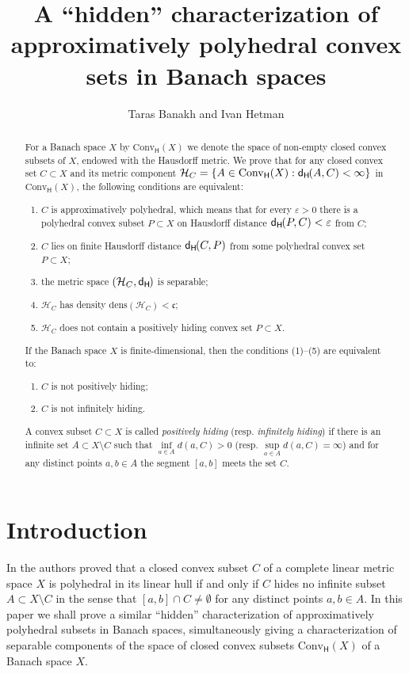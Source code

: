 \documentclass{amsart}
\title[On approximatively polyhedral convex sets]{A ``hidden'' characterization of\\ approximatively polyhedral convex sets in Banach spaces}
\author{Taras Banakh and Ivan Hetman}
\newcommand{\e}{\varepsilon}
\newcommand{\Conv}{\mathrm{Conv}}
\newcommand{\HH}{\mathcal H}
\newcommand{\dens}{\mathrm{dens}}
\newcommand{\dH}{\mathsf{d}_{\mathsf H}\kern-1pt}
\newcommand{\ConvH}{\Conv_{\mathsf H}}
\theoremstyle{definition}
\begin{document}
\begin{abstract} For a Banach space $X$ by $\ConvH(X)$ we denote the space of non-empty closed convex subsets of $X$, endowed with the Hausdorff metric. We prove that for any closed convex set $C\subset X$ and its metric component $\HH_C=\{A\in\ConvH(X):\dH(A,C)<\infty\}$ in $\ConvH(X)$, the following conditions are equivalent:
\begin{enumerate}
\item $C$ is approximatively polyhedral, which means that for every $\e>0$ there is a polyhedral convex subset $P\subset X$ on Hausdorff distance $\dH(P,C)<\e$ from $C$;
\item $C$ lies on finite Hausdorff distance $\dH(C,P)$ from some polyhedral convex set $P\subset X$;
\item the metric space $(\HH_C,\dH)$ is separable;
\item $\HH_C$ has density $\dens(\HH_C)<\mathfrak c$;
\item $\HH_C$ does not contain a positively hiding convex set $P\subset X$.
\end{enumerate}
If the Banach space $X$ is finite-dimensional, then the conditions (1)--(5) are equivalent to:
\begin{enumerate}
\item[(6)] $C$ is not positively hiding;
\item[(7)] $C$ is not infinitely hiding.
\end{enumerate}
A convex subset $C\subset X$ is called {\em positively hiding} (resp. {\em infinitely hiding}) if there is an infinite set $A\subset X\setminus C$ such that $\inf\limits_{a\in A}d(a,C)>0$ (resp. $\sup\limits_{a\in A}d(a,C)=\infty$) and for any distinct points $a,b\in A$ the segment $[a,b]$ meets the set $C$.
\end{abstract}
\maketitle

\section{Introduction}

In \cite{BH} the authors proved that a closed convex subset $C$ of a complete linear metric space $X$ is polyhedral in its linear hull if and only if $C$ hides no infinite subset $A\subset X\setminus C$ in the sense that $[a,b]\cap C\ne\emptyset$ for any distinct points $a,b\in A$. In this paper we shall prove a similar ``hidden'' characterization of approximatively polyhedral subsets in Banach spaces, simultaneously giving a characterization of separable components of the space of closed convex subsets $\ConvH(X)$ of a Banach space $X$.
\end{document}

